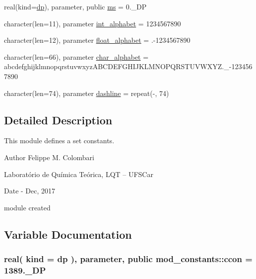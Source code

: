 \begin{DoxyCompactItemize}
real(kind=\hyperlink{namespacemod__constants_ac7aeda7f1802c4ef2a4780773c028214}{dp}), parameter, public \hyperlink{namespacemod__constants_ab31d074fb8a49a9991d7d6e3d4904d59}{ms} = 0.\+\_\+\+DP
\item 
character(len=11), parameter \hyperlink{namespacemod__constants_a41cb897f7d31e58ab3c2b2f7ecf86983}{int\+\_\+alphabet} = \textquotesingle{}1234567890\textquotesingle{}
\item 
character(len=12), parameter \hyperlink{namespacemod__constants_a4b168363a34adf3e1236769aa1ec0fed}{float\+\_\+alphabet} = \textquotesingle{}.-\/1234567890\textquotesingle{}
\item 
character(len=66), parameter \hyperlink{namespacemod__constants_a1d9e53f57f87f727d4dd13f1dd4b8e45}{char\+\_\+alphabet} = \textquotesingle{}abcdefghijklmnopqrstuvwxyz\+A\+B\+C\+D\+E\+F\+G\+H\+I\+J\+K\+L\+M\+N\+O\+P\+Q\+R\+S\+T\+U\+V\+W\+X\+Y\+Z.\+\_\+-\/1234567890 \textquotesingle{}
\item 
character(len=74), parameter \hyperlink{namespacemod__constants_ab55dac3c52ff6b1034697c6e83ac76d8}{dashline} = repeat(\textquotesingle{}-\/\textquotesingle{}, 74)
\end{DoxyCompactItemize}


\subsection{Detailed Description}
This module defines a set constants. 

\begin{DoxyAuthor}{Author}
Felippe M. Colombari
\begin{DoxyItemize}
\item Laboratório de Química Teórica, L\+QT -- U\+F\+S\+Car 
\end{DoxyItemize}
\end{DoxyAuthor}
\begin{DoxyDate}{Date}
-\/ Dec, 2017
\begin{DoxyItemize}
\item module created 
\end{DoxyItemize}
\end{DoxyDate}


\subsection{Variable Documentation}
\subsubsection[{\texorpdfstring{ccon}{ccon}}]{\setlength{\rightskip}{0pt plus 5cm}real( kind = {\bf dp} ), parameter, public mod\+\_\+constants\+::ccon = 1389.\+\_\+\+DP}\hypertarget{namespacemod__constants_a0943b8c8fb52658fb3d4370e5defb34b}{}\label{namespacemod__constants_a0943b8c8fb52658fb3d4370e5defb34b}


